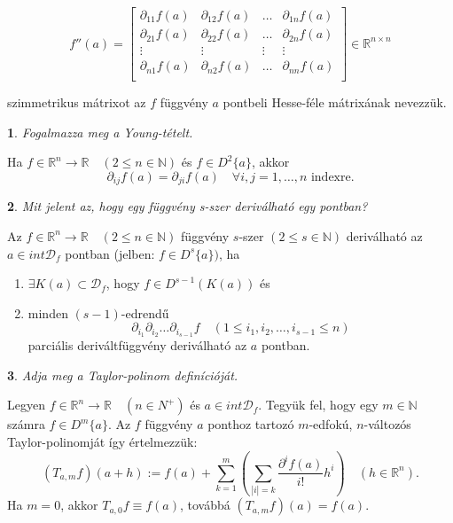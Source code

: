 \documentclass[a4paper]{article}
\def\R{\mathbb{R}}
\def\N{\mathbb{N}}
\theoremstyle{qstyle}
\newtheorem{question}{}{}
\begin{document}
	$$f''(a) = \begin{bmatrix} 
	\partial_{11}f(a) & \partial_{12}f(a) & \dots & \partial_{1n}f(a) \\
	\partial_{21}f(a) & \partial_{22}f(a) & \dots & \partial_{2n}f(a) \\
	\vdots & \vdots &  \vdots &  \vdots  \\
	\partial_{n1}f(a) & \partial_{n2}f(a) & \dots & \partial_{nn}f(a) \\
	\end{bmatrix} \in \R^{n \times n}$$

	szimmetrikus mátrixot az $f$ függvény $a$ pontbeli Hesse-féle mátrixának nevezzük.
	
	\begin{question}
		Fogalmazza meg a Young-tételt.
	\end{question}
	Ha $f \in \R^n \to \R \quad (2 \le n \in \N)$ és $f \in D^2\{a\}$, akkor
	$$\partial_{ij}f(a) = \partial_{ji}f(a) \quad \forall i,j = 1,\dots,n \text{ indexre.}$$

	\begin{question}
		Mit jelent az, hogy egy függvény s-szer deriválható egy pontban?
	\end{question}
	Az $f \in \R^n \to \R \quad (2 \le n \in \N)$ függvény $s$-szer $(2 \le s \in \N)$ deriválható az $a \in int\mathcal{D}_f$ pontban (jelben: $f \in D^s\{a\})$, ha
	\vspace{-4mm}
	\begin{enumerate}
		\item $\exists K(a) \subset \mathcal{D}_f$, hogy $f \in D^{s-1}(K(a))$ és
		\item minden $(s-1)$-edrendű
			$$\partial_{i_1} \partial_{i_2} \dots \partial_{i_{s-1}}f \quad (1 \le i_1,i_2,\dots,i_{s-1} \le n)$$
		parciális deriváltfüggvény deriválható az $a$ pontban.
	\end{enumerate}
	\vspace{-4mm}
	
	
	\begin{question}
		Adja meg a Taylor-polinom definícióját.
	\end{question}
	Legyen $f \in \R^n \to \R \quad (n \in N^+)$ és $a \in int\mathcal{D}_f$. Tegyük fel, hogy egy $m \in \N$ számra $f \in D^m\{a\}$. Az $f$ függvény $a$ ponthoz tartozó $m$-edfokú, $n$-változós Taylor-polinomját így értelmezzük:
	$$(T_{a,m}f)(a+h) := f(a) + \sum_{k=1}^{m}\left(\sum_{|i| = k} \frac{\partial^i f(a)}{i!}h^i\right) \quad (h \in \R^n) \text{.}$$
	Ha $m=0$, akkor $T_{a,0}f \equiv f(a)$, továbbá $(T_{a,m}f)(a)=f(a)$.
	
\end{document}
